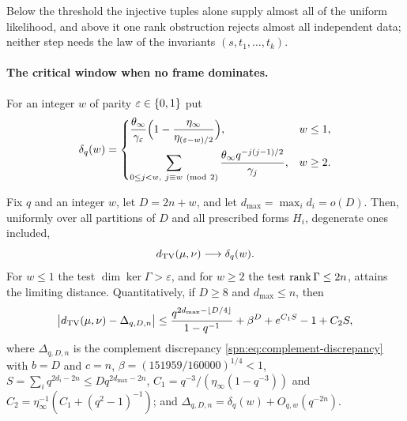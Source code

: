Below the threshold the injective tuples alone supply almost all of the uniform likelihood, and
above it one rank obstruction rejects almost all independent data; neither step needs the law of the
invariants $(s,t_1,\dots,t_k)$.

\paragraph{The critical window when no frame dominates.}
For an integer $w$ of parity $\varepsilon\in\{0,1\}$ put
\begin{equation}\label{spn:eq:joint-profile}
 \delta_q(w)=
 \begin{cases}
 \dfrac{\theta_\infty}{\gamma_\varepsilon}\Bigl(1-\dfrac{\eta_\infty}{\eta_{(\varepsilon-w)/2}}\Bigr),
 &w\le1,\\[10pt]
 \displaystyle\sum_{0\le j<w,\ j\equiv w\ (\mathrm{mod}\ 2)}\frac{\theta_\infty q^{-j(j-1)/2}}{\gamma_j},
 &w\ge2.
 \end{cases}
\end{equation}

\begin{theorem}\label{spn:thm:joint-profile}
Fix $q$ and an integer $w$, let $D=2n+w$, and let $d_{\max}=\max_id_i=o(D)$. Then, uniformly over all
partitions of $D$ and all prescribed forms $H_i$, degenerate ones included,
\[
 d_{\mathrm{TV}}(\mu,\nu)\longrightarrow\delta_q(w).
\]
For $w\le1$ the test $\dim\ker\Gamma>\varepsilon$, and for $w\ge2$ the test $\operatorname{rank}\Gamma\le2n$,
attains the limiting distance. Quantitatively, if $D\ge8$ and $d_{\max}\le n$, then
\begin{equation}\label{spn:eq:joint-profile-bound}
 \bigl|d_{\mathrm{TV}}(\mu,\nu)-\Delta_{q,D,n}\bigr|
 \le\frac{q^{2d_{\max}-\lfloor D/4\rfloor}}{1-q^{-1}}+\beta^D+e^{C_1S}-1+C_2S,
\end{equation}
where $\Delta_{q,D,n}$ is the complement discrepancy \eqref{spn:eq:complement-discrepancy} with
$b=D$ and $c=n$, $\beta=(151959/160000)^{1/4}<1$, $S=\sum_iq^{2d_i-2n}\le Dq^{2d_{\max}-2n}$,
$C_1=q^{-3}/(\eta_\infty(1-q^{-3}))$ and $C_2=\eta_\infty^{-1}(C_1+(q^2-1)^{-1})$; and
$\Delta_{q,D,n}=\delta_q(w)+O_{q,w}(q^{-2n})$.
\end{theorem}

